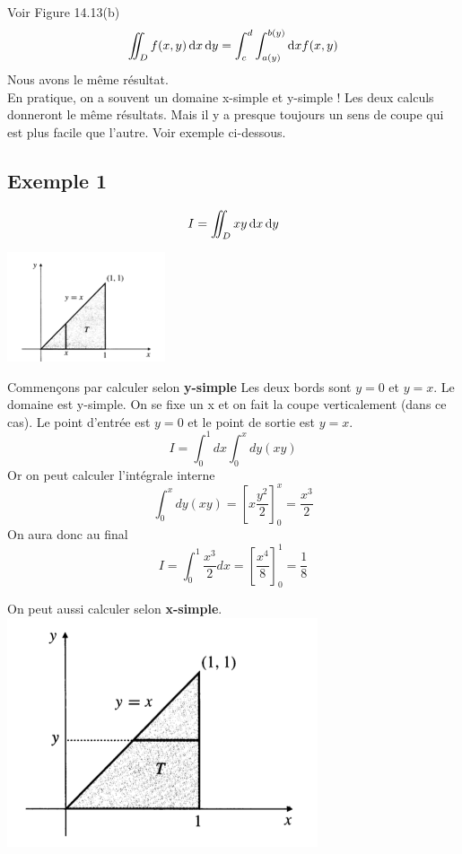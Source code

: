 Voir Figure 14.13(b)
\[\iint_D f(x,y) \operatorname{d}\! x \operatorname{d}\! y = \int_c^d\int_{a(y)}^{b(y)} \operatorname{d}\! x f(x,y)\]
Nous avons le même résultat.\\
En pratique, on a souvent un domaine x-simple et y-simple ! Les deux calculs donneront le même résultats. Mais il y a presque toujours un sens de coupe qui est plus facile que l'autre. Voir exemple ci-dessous.

\subsection{Exemple 1}
\[ I=\iint_D xy \operatorname{d}\! x \operatorname{d}\! y \]
\begin{center}

\includegraphics[scale=1]{image2.png}

\end{center}
Commençons par calculer selon \textbf{y-simple}
Les deux bords sont $y=0$ et $y=x$. Le domaine est y-simple. On se fixe un x et on fait la coupe verticalement (dans ce cas). Le point d'entrée est $y=0$ et le point de sortie est $y=x$.
\[I=\int_0^1 dx \int_0^x dy(xy)\]
Or on peut calculer l'intégrale interne
\[\int_0^x dy(xy) = \left[ x \frac{y^2}{2} \right]_0^x = \frac{x^3}{2}\]
On aura donc au final
\[I=\int_0^1\frac{x^3}{2} dx = \left[\frac{x^4}{8}\right]_0^1= \frac{1}{8}\]

On peut aussi calculer selon \textbf{x-simple}.
\\
\includegraphics[scale=0.5]{image3}
\\

